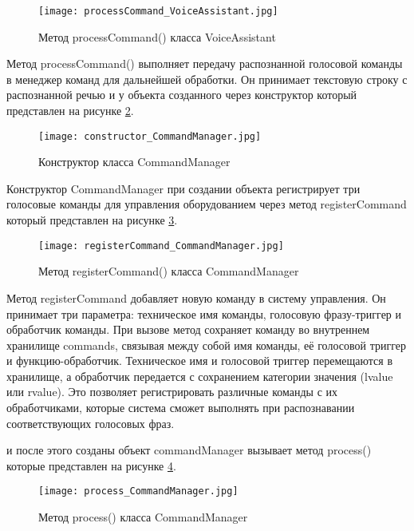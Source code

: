 \begin{figure}[H]
	\centering
	\texttt{[image: processCommand\_VoiceAssistant.jpg]}
	\caption{Метод processCommand()  класса VoiceAssistant}
	\label{fig:processCommand_VoiceAssistant}
\end{figure}

Метод processCommand() выполняет передачу распознанной голосовой команды в менеджер команд для дальнейшей обработки. Он принимает текстовую строку с распознанной речью и у объекта созданного через конструктор который представлен на рисунке \ref{fig:constructor_CommandManager}.


\begin{figure}[H]
	\centering
	\texttt{[image: constructor\_CommandManager.jpg]}
	\caption{Конструктор класса CommandManager}
	\label{fig:constructor_CommandManager}
\end{figure}

Конструктор CommandManager при создании объекта регистрирует три голосовые команды для управления оборудованием через метод registerCommand который представлен на рисунке \ref{fig:registerCommand_CommandManager}.

\begin{figure}[H]
	\centering
	\texttt{[image: registerCommand\_CommandManager.jpg]}
	\caption{Метод registerCommand()  класса CommandManager}
	\label{fig:registerCommand_CommandManager}
\end{figure}

Метод registerCommand добавляет новую команду в систему управления. Он принимает три параметра: техническое имя команды, голосовую фразу-триггер и обработчик команды. При вызове метод сохраняет команду во внутреннем хранилище commands, связывая между собой имя команды, её голосовой триггер и функцию-обработчик. Техническое имя и голосовой триггер перемещаются в хранилище, а обработчик передается с сохранением категории значения (lvalue или rvalue). Это позволяет регистрировать различные команды с их обработчиками, которые система сможет выполнять при распознавании соответствующих голосовых фраз.

 и после этого созданы объект commandManager вызывает метод process() которые представлен на рисунке \ref{fig:process_CommandManager}.

\begin{figure}[H]
	\centering
	\texttt{[image: process\_CommandManager.jpg]}
	\caption{Метод process()  класса CommandManager}
	\label{fig:process_CommandManager}
\end{figure}

